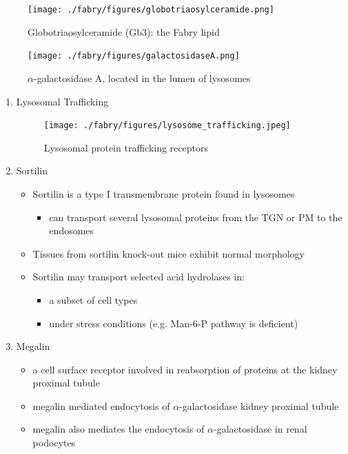 \documentclass{scrartcl}
\begin{document}
\begin{enumerate}
\begin{figure}[htbp]
\centering
\texttt{[image: ./fabry/figures/globotriaosylceramide.png]}
\caption[Globotriaosylceramide]{\label{fig:org2305a5c}
Globotriaosylceramide (Gb3): the Fabry lipid}
\end{figure}

\begin{figure}[htbp]
\centering
\texttt{[image: ./fabry/figures/galactosidaseA.png]}
\caption[\(\alpha\)-galactosidase A]{\label{fig:org36304bb}
\(\alpha\)-galactosidase A, located in the lumen of lysosomes}
\end{figure}


\begin{enumerate}
\item Lysosomal Trafficking
\label{sec:org085bd73}

\begin{figure}[htbp]
\centering
\texttt{[image: ./fabry/figures/lysosome\_trafficking.jpeg]}
\caption[Lysosomal protein trafficking receptors]{\label{fig:orgcc64dae}
Lysosomal protein trafficking receptors}
\end{figure}


\item Sortilin
\label{sec:org41bf8f0}

\begin{itemize}
\item Sortilin is a type I transmembrane protein found in lysosomes
\begin{itemize}
\item can transport several lysosomal proteins from the TGN or PM to the endosomes
\end{itemize}
\item Tissues from sortilin knock-out mice exhibit normal morphology
\item Sortilin may transport selected acid hydrolases in:
\begin{itemize}
\item a subset of cell types
\item under stress conditions (e.g. Man-6-P pathway is deficient)
\end{itemize}
\end{itemize}

\item Megalin
\label{sec:orga25c117}
\begin{itemize}
\item a cell surface receptor involved in reabsorption of proteins at the kidney proximal tubule
\item megalin mediated endocytosis of \(\alpha\)-galactosidase kidney proximal tubule
\item megalin also mediates the endocytosis of \(\alpha\)-galactosidase in renal podocytes
\end{itemize}
\end{enumerate}


\end{enumerate}
\end{document}
